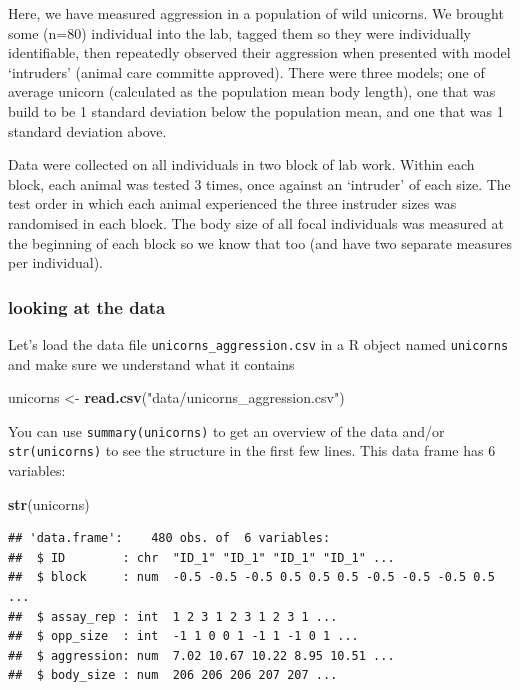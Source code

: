 \documentclass[
  12pt,
]{book}
\newenvironment{Shaded}{\begin{snugshade}}{\end{snugshade}}
\newcommand{\KeywordTok}[1]{\textcolor[rgb]{0.13,0.29,0.53}{\textbf{#1}}}
\newcommand{\NormalTok}[1]{#1}
\newcommand{\StringTok}[1]{\textcolor[rgb]{0.31,0.60,0.02}{#1}}
\begin{document}
Here, we have measured aggression in a population of wild unicorns. We brought some (n=80) individual into the lab, tagged them so they were individually identifiable, then repeatedly observed their aggression when presented with model `intruders' (animal care committe approved). There were three models; one of average unicorn (calculated as the population mean body length), one that was build to be 1 standard deviation below the population mean, and one that was 1 standard deviation above.

Data were collected on all individuals in two block of lab work. Within each block, each animal was tested 3 times, once against an `intruder' of each size. The test order in which each animal experienced the three instruder sizes was randomised in each block. The body size of all focal individuals was measured at the beginning of each block so we know that too (and have two separate measures per individual).

\hypertarget{looking-at-the-data}{%
\subsubsection{looking at the data}\label{looking-at-the-data}}

Let's load the data file \texttt{unicorns\_aggression.csv} in a R object named \texttt{unicorns} and make sure we understand what it contains

\begin{Shaded}
\begin{Highlighting}[]
\NormalTok{unicorns \textless{}{-}}\StringTok{ }\KeywordTok{read.csv}\NormalTok{(}\StringTok{"data/unicorns\_aggression.csv"}\NormalTok{)}
\end{Highlighting}
\end{Shaded}

You can use \texttt{summary(unicorns)} to get an overview of the data and/or \texttt{str(unicorns)} to see the structure in the first few lines. This data frame has 6 variables:

\begin{Shaded}
\begin{Highlighting}[]
\KeywordTok{str}\NormalTok{(unicorns)}
\end{Highlighting}
\end{Shaded}

\begin{verbatim}
## 'data.frame':    480 obs. of  6 variables:
##  $ ID        : chr  "ID_1" "ID_1" "ID_1" "ID_1" ...
##  $ block     : num  -0.5 -0.5 -0.5 0.5 0.5 0.5 -0.5 -0.5 -0.5 0.5 ...
##  $ assay_rep : int  1 2 3 1 2 3 1 2 3 1 ...
##  $ opp_size  : int  -1 1 0 0 1 -1 1 -1 0 1 ...
##  $ aggression: num  7.02 10.67 10.22 8.95 10.51 ...
##  $ body_size : num  206 206 206 207 207 ...
\end{verbatim}
\end{document}
